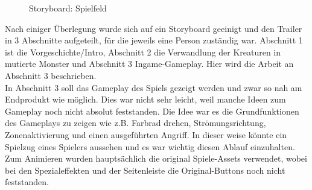 \begin{figure}[h]
\centering
\qquad
\qquad
\caption{Storyboard: Spielfeld}%
 \label{fig:Storyboard: Spielfeld}%
\end{figure}
Nach einiger Überlegung wurde sich auf ein Storyboard geeinigt und den Trailer in 3 Abschnitte aufgeteilt, für die jeweils eine Person zuständig war. Abschnitt 1 ist die Vorgeschichte/Intro, Abschnitt 2 die Verwandlung der Kreaturen in mutierte Monster und Abschnitt 3 Ingame-Gameplay. Hier wird die Arbeit an Abschnitt 3 beschrieben.\\
In Abschnitt 3 soll das Gameplay des Spiels gezeigt werden und zwar so nah am Endprodukt wie möglich. Dies war nicht sehr leicht, weil manche Ideen zum Gameplay noch nicht absolut feststanden. Die Idee war es die Grundfunktionen des Gameplays zu zeigen wie z.B. Farbrad drehen, Strömungsrichtung, Zonenaktivierung und einen ausgeführten Angriff. In dieser weise könnte ein Spielzug eines Spielers aussehen und es war wichtig diesen Ablauf einzuhalten. Zum Animieren wurden hauptsächlich die original Spiele-Assets verwendet, wobei bei den Spezialeffekten und der Seitenleiste die Original-Buttons noch nicht feststanden.
